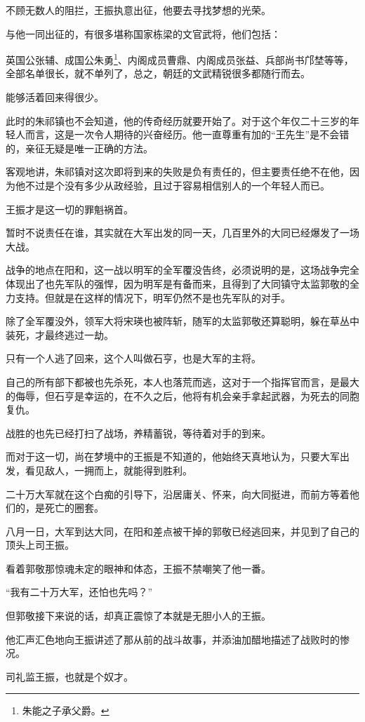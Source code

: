 \begin{multicols}{\theparacolNo}
不顾无数人的阻拦，王振执意出征，他要去寻找梦想的光荣。

与他一同出征的，有很多堪称国家栋梁的文官武将，他们包括：

英国公张辅、成国公朱勇\footnote{朱能之子承父爵。}、内阁成员曹鼎、内阁成员张益、兵部尚书邝埜等等，全部名单很长，就不单列了，总之，朝廷的文武精锐很多都随行而去。

能够活着回来得很少。

此时的朱祁镇也不会知道，他的传奇经历就要开始了。对于这个年仅二十三岁的年轻人而言，这是一次令人期待的兴奋经历。他一直尊重有加的“王先生”是不会错的，亲征无疑是唯一正确的方法。

客观地讲，朱祁镇对这次即将到来的失败是负有责任的，但主要责任绝不在他，因为他不过是个没有多少从政经验，且过于容易相信别人的一个年轻人而已。

王振才是这一切的罪魁祸首。

暂时不说责任在谁，其实就在大军出发的同一天，几百里外的大同已经爆发了一场大战。

战争的地点在阳和，这一战以明军的全军覆没告终，必须说明的是，这场战争完全体现出了也先军队的强悍，因为明军是有备而来，且得到了大同镇守太监郭敬的全力支持。但就是在这样的情况下，明军仍然不是也先军队的对手。

除了全军覆没外，领军大将宋瑛也被阵斩，随军的太监郭敬还算聪明，躲在草丛中装死，才最终逃过一劫。

只有一个人逃了回来，这个人叫做石亨，也是大军的主将。

自己的所有部下都被也先杀死，本人也落荒而逃，这对于一个指挥官而言，是最大的侮辱，但石亨是幸运的，在不久之后，他将有机会亲手拿起武器，为死去的同胞复仇。

战胜的也先已经打扫了战场，养精蓄锐，等待着对手的到来。

而对于这一切，尚在梦境中的王振是不知道的，他始终天真地认为，只要大军出发，看见敌人，一拥而上，就能得到胜利。

二十万大军就在这个白痴的引导下，沿居庸关、怀来，向大同挺进，而前方等着他们的，是死亡的圈套。

八月一日，大军到达大同，在阳和差点被干掉的郭敬已经逃回来，并见到了自己的顶头上司王振。

看着郭敬那惊魂未定的眼神和体态，王振不禁嘲笑了他一番。

“我有二十万大军，还怕也先吗？”

但郭敬接下来说的话，却真正震惊了本就是无胆小人的王振。

他汇声汇色地向王振讲述了那从前的战斗故事，并添油加醋地描述了战败时的惨况。

司礼监王振，也就是个奴才。


\end{multicols}
